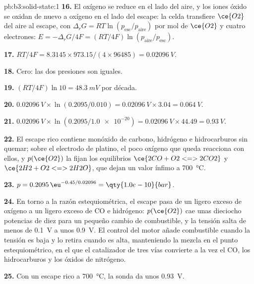 \begin{solution}{pb:b3:solid-state:1}
\textbf{16.} El oxígeno se reduce en el lado del aire, y los iones óxido se oxidan de nuevo
a oxígeno en el lado del escape: la celda transfiere $\ce{O2}$ del aire al escape, con
$\Delta_rG = RT\ln(p_{\mathrm{esc}}/p_{\mathrm{aire}})$ por mol de $\ce{O2}$ y cuatro electrones: $E = -\Delta_rG/4F = (RT/4F)\ln(p_{\mathrm{aire}}/p_{\mathrm{esc}})$.

\textbf{17.} $RT/4F = 8.3145 \times 973.15/(4 \times 96485) = \qty{0.02096}{V}$.

\textbf{18.} Cero: las dos presiones son iguales.

\textbf{19.} $(RT/4F)\ln 10 = \qty{48.3}{mV}$ por década.

\textbf{20.} $\qty{0.02096}{V} \times \ln(0.2095/0.010) = \qty{0.02096}{V} \times 3.04 = \qty{0.064}{V}$.

\textbf{21.} $\qty{0.02096}{V} \times \ln(0.2095/\num{1.0e-20}) = \qty{0.02096}{V} \times 44.49 = \qty{0.93}{V}$.

\textbf{22.} El escape rico contiene monóxido de carbono, hidrógeno e hidrocarburos sin
quemar; sobre el electrodo de platino, el poco oxígeno que queda reacciona con ellos,
y $p(\ce{O2})$ la fijan los equilibrios $\ce{2CO + O2 <=> 2CO2}$ y $\ce{2H2 + O2 <=> 2H2O}$, que dejan un valor
ínfimo a \qty{700}{\celsius}.

\textbf{23.} $p = 0.2095\,\eu^{-0.45/0.02096} = \qty{1.0e-10}{bar}$.

\textbf{24.} En torno a la razón estequiométrica, el escape pasa de un ligero exceso
de oxígeno a un ligero exceso de CO e hidrógeno: $p(\ce{O2})$ cae unas dieciocho
potencias de diez para un pequeño cambio de combustible, y la tensión salta de menos de
\qty{0.1}{V} a unos \qty{0.9}{V}. El control del motor añade combustible cuando la tensión es baja y
lo retira cuando es alta, manteniendo la mezcla en el punto estequiométrico, en el que el
catalizador de tres vías convierte a la vez el CO, los hidrocarburos y los óxidos de nitrógeno.

\textbf{25.} Con un escape rico a \qty{700}{\celsius}, la sonda da unos \qty{0.93}{V}.
\end{solution}
